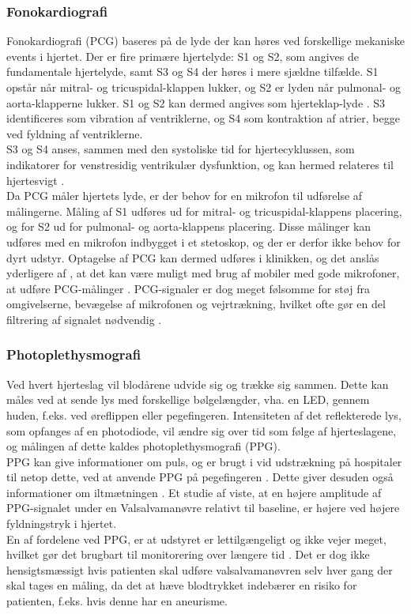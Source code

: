 \subsubsection{Fonokardiografi}
Fonokardiografi (PCG) baseres på de lyde der kan høres ved forskellige mekaniske events i hjertet. Der er fire primære hjertelyde: S1 og S2, som angives de fundamentale hjertelyde, samt S3 og S4 der høres i mere sjældne tilfælde. S1 opstår når mitral- og tricuspidal-klappen lukker, og S2 er lyden når pulmonal- og aorta-klapperne lukker. S1 og S2 kan dermed angives som hjerteklap-lyde \citep{kovacs2011fetal}. S3 identificeres som vibration af ventriklerne, og S4 som kontraktion af atrier, begge ved fyldning af ventriklerne. \citep{singh2013heart}\\
S3 og S4 anses, sammen med den systoliske tid for hjertecyklussen, som indikatorer for venstresidig ventrikulær dysfunktion, og kan hermed relateres til hjertesvigt \citep{marcus2005association}\citep{shapiro2007diagnostic}.\\
Da PCG måler hjertets lyde, er der behov for en mikrofon til udførelse af målingerne. Måling af S1 udføres ud for mitral- og tricuspidal-klappens placering, og for S2 ud for pulmonal- og aorta-klappens placering. Disse målinger kan udføres med en mikrofon indbygget i et stetoskop, og der er derfor ikke behov for dyrt udstyr. Optagelse af PCG kan dermed udføres i klinikken, og det anslås yderligere af \citet{singh2013heart}, at det kan være muligt med brug af mobiler med gode mikrofoner, at udføre PCG-målinger \citep{singh2013heart}. PCG-signaler er dog meget følsomme for støj fra omgivelserne, bevægelse af mikrofonen og vejrtrækning, hvilket ofte gør en del filtrering af signalet nødvendig \citep{jain2014}.\\

\subsubsection{Photoplethysmografi}
Ved hvert hjerteslag vil blodårene udvide sig og trække sig sammen. Dette kan måles ved at sende lys med forskellige bølgelængder, vha. en LED, gennem huden, f.eks. ved øreflippen eller pegefingeren. Intensiteten af det reflekterede lys, som opfanges af en photodiode, vil ændre sig over tid som følge af hjerteslagene, og målingen af dette kaldes photoplethysmografi (PPG). \citep{jain2014}\\
PPG kan give informationer om puls, og er brugt i vid udstrækning på hospitaler til netop dette, ved at anvende PPG på pegefingeren \citep{jain2014}. Dette giver desuden også informationer om iltmætningen \citep{jain2014}. Et studie af \citet{Gilotra2016} viste, at en højere amplitude af PPG-signalet under en Valsalvamanøvre relativt til baseline, er højere ved højere fyldningstryk i hjertet.\\
En af fordelene ved PPG, er at udstyret er lettilgængeligt og ikke vejer meget, hvilket gør det brugbart til monitorering over længere tid \citep{jain2014}. Det er dog ikke hensigtsmæssigt hvis patienten skal udføre valsalvamanøvren selv hver gang der skal tages en måling, da det at hæve blodtrykket indebærer en risiko for patienten, f.eks. hvis denne har en aneurisme.


